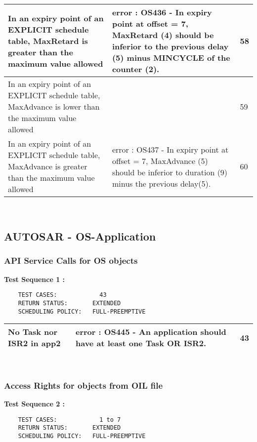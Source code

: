 \documentclass[10pt]{article}
\newlength{\Li}\settowidth{\Li}{Running}
\newlength{\Lii}\setlength{\Lii}{7cm}
\newlength{\Liiii}\setlength{\Liiii}{0.9cm}
\newlength{\Liii}\setlength{\Liii}{\textwidth} \addtolength{\Liii}{-\Li} \addtolength{\Liii}{-\Lii} \addtolength{\Liii}{-\Liiii}
\begin{document}
\begin{supertabular}{|p{\Li}|p{\Lii}|p{\Liii}|}
	In an expiry point of an EXPLICIT schedule table, MaxRetard is greater than the maximum value allowed		& error :  OS436 - In expiry point at offset = 7, MaxRetard (4) should be inferior to the previous delay (5) minus MINCYCLE of the counter (2).																											& 58 \\ \hline
	In an expiry point of an EXPLICIT schedule table, MaxAdvance is lower than the maximum value allowed		& 														& 59 \\ \hline
	In an expiry point of an EXPLICIT schedule table, MaxAdvance is greater than the maximum value allowed		& error : OS437 - In expiry point at offset = 7, MaxAdvance (5) should be inferior to duration (9) minus the previous delay(5).																														& 60 \\ \hline
	\end{supertabular}\\


\subsection{AUTOSAR - OS-Application}
	
	\subsubsection{API Service Calls for OS objects}
	
	\textbf{Test Sequence 1 :}
	\begin{lstlisting}
	TEST CASES:		       43
	RETURN STATUS:	  	 EXTENDED
	SCHEDULING POLICY:   FULL-PREEMPTIVE
	\end{lstlisting}
	
	
	\begin{supertabular}{|p{\Li}|p{\Lii}|p{\Liii}|} \hline 
	No Task nor ISR2 in app2											& error : OS445 - An application should have at least one Task OR ISR2.				 & 43 \\ \hline
	\end{supertabular}\\

	\subsubsection{Access Rights for objects from OIL file}
	
	\textbf{Test Sequence 2 :}
	\begin{lstlisting}
	TEST CASES:		       1 to 7
	RETURN STATUS:	  	 EXTENDED
	SCHEDULING POLICY:   FULL-PREEMPTIVE
	\end{lstlisting}
	
	
\end{document}
